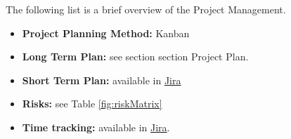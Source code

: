 The following list is a brief overview of the Project Management.

\begin{itemize}
    \item \textbf{Project Planning Method: } Kanban
    \item \textbf{Long Term Plan: } see section section Project Plan.
    \item \textbf{Short Term Plan: } available in \href{https://substep.atlassian.net/jira/software/projects/UI/boards/1/backlog}{Jira}
    \item \textbf{Risks: } see Table \ref*{fig:riskMatrix}
    \item \textbf{Time tracking: } available in \href{https://substep.atlassian.net/jira/software/projects/UI/boards/1/backlog}{Jira}.
\end{itemize}
